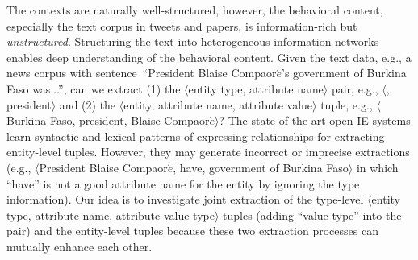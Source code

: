 \documentclass[10.5pt]{article}
\newcommand{\lb}{\mbox{$\langle$}}
\newcommand{\rb}{\mbox{$\rangle$}}
\newcommand{\pair}[2]{{\lb#1, #2\rb}\xspace}
\newcommand{\tuple}[3]{{\lb#1, #2, #3\rb}\xspace}
\newcommand{\eapatterns}{{``$E$-$A$'' patterns}\xspace}
\begin{document}


The contexts are naturally well-structured, however, the behavioral content, especially the text corpus in tweets and papers, is information-rich but \textit{unstructured}. Structuring the text into heterogeneous information networks enables deep understanding of the behavioral content. Given the text data, e.g., a news corpus with sentence~``President Blaise Compaor$\acute{e}$'s government of Burkina Faso was...'', can we extract (1) the \pair{entity type}{attribute name} pair, e.g., \pair{\cscountry}{president} and (2) the \tuple{entity}{attribute name}{attribute value} tuple, e.g., \tuple{Burkina Faso}{president}{Blaise Compaor$\acute{e}$}?
The state-of-the-art open IE systems learn syntactic and lexical patterns of expressing relationships for extracting entity-level tuples. However, they may generate incorrect or imprecise extractions (e.g., \tuple{President Blaise Compaor$\acute{e}$}{have}{government of Burkina Faso} in which ``have'' is not a good attribute name for the entity by ignoring the type information).
Our idea is to investigate joint extraction of the type-level \tuple{entity type}{attribute name}{attribute value type} tuples (adding ``value type'' into the pair) and the entity-level tuples because these two extraction processes can mutually enhance each other.
\end{document}
